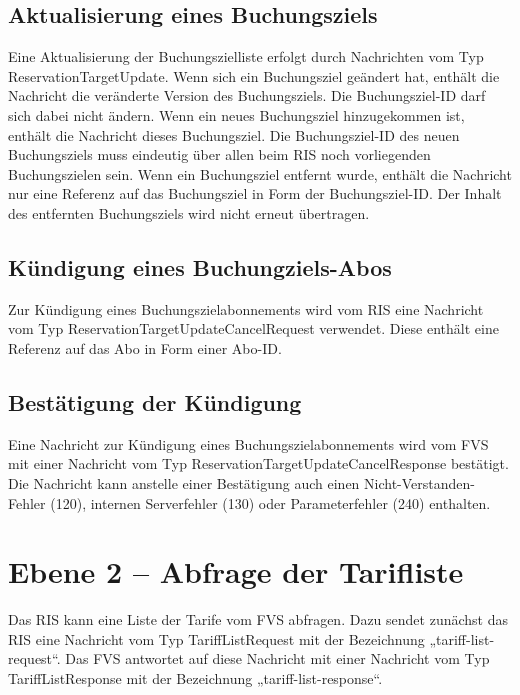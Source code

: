 

\subsection{Aktualisierung eines Buchungsziels}
Eine Aktualisierung der Buchungszielliste erfolgt durch Nachrichten vom Typ ReservationTargetUpdate. Wenn sich ein Buchungsziel geändert hat, enthält die Nachricht die veränderte Version des Buchungsziels. Die Buchungsziel-ID darf sich dabei nicht ändern. Wenn ein neues Buchungsziel hinzugekommen ist, enthält die Nachricht dieses Buchungsziel. Die Buchungsziel-ID des neuen Buchungsziels muss eindeutig über allen beim RIS noch vorliegenden Buchungszielen sein. Wenn ein Buchungsziel entfernt wurde, enthält die Nachricht nur eine Referenz auf das Buchungsziel in Form der Buchungsziel-ID. Der Inhalt des entfernten Buchungsziels wird nicht erneut übertragen.



\subsection{Kündigung eines Buchungziels-Abos}
Zur Kündigung eines Buchungszielabonnements wird vom RIS eine Nachricht vom Typ ReservationTargetUpdateCancelRequest verwendet. Diese enthält eine Referenz auf das Abo in Form einer Abo-ID.



\subsection{Bestätigung der Kündigung}
Eine Nachricht zur Kündigung eines Buchungszielabonnements wird vom FVS mit einer Nachricht vom Typ ReservationTargetUpdateCancelResponse bestätigt. Die Nachricht kann anstelle einer Bestätigung auch einen Nicht-Verstanden-Fehler (120), internen Serverfehler (130) oder Parameterfehler (240) enthalten.




\section{Ebene 2 -- Abfrage der Tarifliste}
Das RIS kann eine Liste der Tarife vom FVS abfragen. Dazu sendet zunächst das RIS eine Nachricht vom Typ TariffListRequest mit der Bezeichnung „tariff-list-request“. Das FVS antwortet auf diese Nachricht mit einer Nachricht vom Typ TariffListResponse mit der Bezeichnung „tariff-list-response“.

